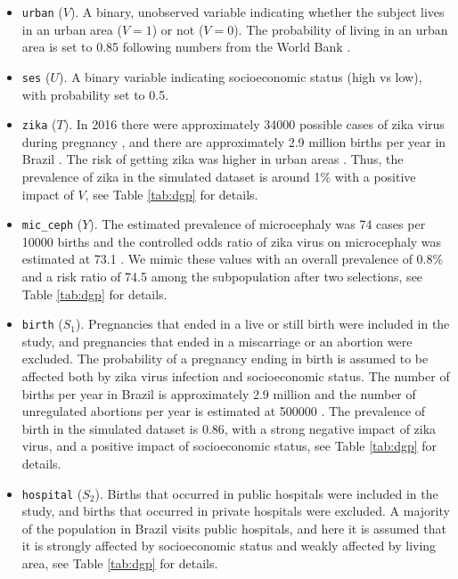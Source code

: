 \begin{itemize}
\tightlist
\item
  \texttt{urban} (\(V\)). A binary, unobserved variable indicating whether the subject
  lives in an urban area (\(V=1\)) or not (\(V=0\)). The probability of
  living in an urban area is set to 0.85 following numbers from the World Bank \citep{urban}.
\item
  \texttt{ses} (\(U\)). A binary variable indicating
  socioeconomic status (high vs low), with probability set to 0.5.
\item
  \texttt{zika} (\(T\)). In 2016 there were approximately 34000 possible cases of zika virus
  during pregnancy \citep{de2017infection}, and there are approximately 2.9 million
  births per year in Brazil \citep{diniz2019understanding}. The risk of getting zika was
  higher in urban areas \citep{ali2017environmental}. Thus, the prevalence of zika
  in the simulated dataset is around 1\% with a positive impact of \(V\), see
  Table \ref{tab:dgp} for details.
\item
  \texttt{mic\_ceph} (\(Y\)). The estimated prevalence of microcephaly was 74
  cases per 10000 births and the controlled odds ratio of zika virus on
  microcephaly was estimated at 73.1 \citep{de2018association}. We mimic these
  values with an overall prevalence of 0.8\% and a risk ratio of 74.5 among
  the subpopulation after two selections, see Table \ref{tab:dgp} for details.
\item
  \texttt{birth} (\(S_1\)). Pregnancies that ended in a live or still birth were
  included in the study, and pregnancies that ended in a miscarriage or an
  abortion were excluded. The probability of a pregnancy ending in birth is
  assumed to be affected both by zika virus infection and socioeconomic
  status. The number of births per year in Brazil is approximately 2.9 million
  and the number of unregulated abortions per year is estimated at 500000
  \citep{malta2019abortion}. The prevalence of birth in the simulated dataset is
  0.86, with a strong negative impact of zika virus, and a positive impact of
  socioeconomic status, see Table \ref{tab:dgp} for details.
\item
  \texttt{hospital} (\(S_2\)). Births that occurred in public hospitals were
  included in the study, and births that occurred in private hospitals were
  excluded. A majority of the population in Brazil visits public hospitals,
  and here it is assumed that it is strongly affected by socioeconomic status
  and weakly affected by living area, see Table \ref{tab:dgp} for details.
\end{itemize}

